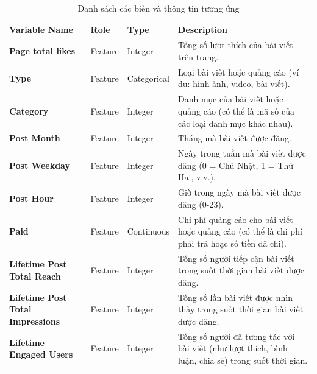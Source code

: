 \begin{table}[H]
\centering
\begin{tabular}{|l|l|l|p{7cm}|}
\hline
\textbf{Variable Name}                  & \textbf{Role}   & \textbf{Type}        & \textbf{Description}                                                                                     \\ \hline
\textbf{Page total likes}               & Feature         & Integer              & Tổng số lượt thích của bài viết trên trang.                                                              \\ \hline
\textbf{Type}                           & Feature         & Categorical          & Loại bài viết hoặc quảng cáo (ví dụ: hình ảnh, video, bài viết).                                         \\ \hline
\textbf{Category}                       & Feature         & Integer              & Danh mục của bài viết hoặc quảng cáo (có thể là mã số của các loại danh mục khác nhau).                  \\ \hline
\textbf{Post Month}                     & Feature         & Integer              & Tháng mà bài viết được đăng.                                                                             \\ \hline
\textbf{Post Weekday}                   & Feature         & Integer              & Ngày trong tuần mà bài viết được đăng (0 = Chủ Nhật, 1 = Thứ Hai, v.v.).                                 \\ \hline
\textbf{Post Hour}                      & Feature         & Integer              & Giờ trong ngày mà bài viết được đăng (0-23).                                                            \\ \hline
\textbf{Paid}                           & Feature         & Continuous           & Chi phí quảng cáo cho bài viết hoặc quảng cáo (có thể là chi phí phải trả hoặc số tiền đã chi).         \\ \hline
\textbf{Lifetime Post Total Reach}      & Feature         & Integer              & Tổng số người tiếp cận bài viết trong suốt thời gian bài viết được đăng.                                \\ \hline
\textbf{Lifetime Post Total Impressions}& Feature         & Integer              & Tổng số lần bài viết được nhìn thấy trong suốt thời gian bài viết được đăng.                            \\ \hline
\textbf{Lifetime Engaged Users}         & Feature         & Integer              & Tổng số người đã tương tác với bài viết (như lượt thích, bình luận, chia sẻ) trong suốt thời gian.      \\ \hline
\end{tabular}
\caption{Danh sách các biến và thông tin tương ứng}
\label{table:variables}
\end{table}

